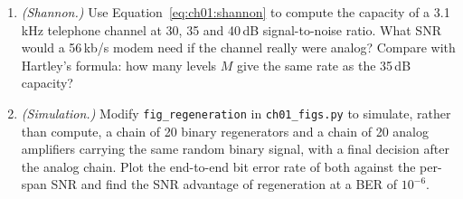 \begin{enumerate}[label=\thechapter.\arabic*]
NTSC colour numbers $f_H$, $f_{\text{frame}}$ and $f_{sc}$ quoted in the text.
\item \emph{(Shannon.)} Use Equation~\eqref{eq:ch01:shannon} to compute the capacity of a 3.1\,kHz
telephone channel at 30, 35 and 40\,dB signal-to-noise ratio. What SNR would a 56\,kb/s modem need if the
channel really were analog? Compare with Hartley's formula: how many levels $M$ give the same rate as the
35\,dB capacity?
\item \emph{(Simulation.)} Modify \texttt{fig\_regeneration} in \texttt{ch01\_figs.py} to simulate, rather than
compute, a chain of 20 binary regenerators and a chain of 20 analog amplifiers carrying the same random
binary signal, with a final decision after the analog chain. Plot the end-to-end bit error rate of both
against the per-span SNR and find the SNR advantage of regeneration at a BER of $10^{-6}$.
\end{enumerate}

